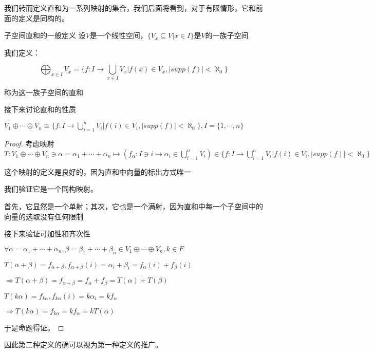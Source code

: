 \documentclass[12pt, a4paper, oneside, UTF8]{ctexbook}
\begin{document}
			我们转而定义直和为一系列映射的集合，我们后面将看到，对于有限情形，它和前面的定义是同构的。
			\begin{defn}{子空间直和的一般定义}
				设$V$是一个线性空间，$\{V_x \subseteq V| x \in I\}$是$V$的一族子空间

				我们定义：

				\begin{equation}
					\bigoplus_{x \in I} V_x = \{f: I \to \bigcup_{x \in I} V_x| f(x) \in V_x,|supp(f)| < \aleph_0\}
				\end{equation}

				称为这一族子空间的直和
			\end{defn}
			接下来讨论直和的性质
			\begin{para}{0}
				\point{}
					\begin{proposition}
						$V_1 \oplus \cdots \oplus V_n \cong \{f: I \to \bigcup\limits_{i=1}^{n} V_i| f(i) \in V_i,|supp(f)| < \aleph_0\},I=\{1,\cdots,n\}$
					\end{proposition}
					\begin{proof}
						考虑映射$T:V_1 \oplus \cdots \oplus V_n \ni \alpha = \alpha_1 + \cdots+\alpha_n \mapsto \left(f_\alpha : I \ni i \mapsto \alpha_i \in \bigcup_{i=1}^{n} V_i\right) \in \{f: I \to \bigcup\limits_{i=1}^{n} V_i| f(i) \in V_i,|supp(f)| < \aleph_0\}$
					
						这个映射的定义是良好的，因为直和中向量的标出方式唯一

						我们验证它是一个同构映射。

						首先，它显然是一个单射；其次，它也是一个满射，因为直和中每一个子空间中的向量的选取没有任何限制

						接下来验证可加性和齐次性

						$\forall \alpha =\alpha_1+\cdots+\alpha_n,\beta =\beta_1+\cdots+\beta_n \in V_1 \oplus \cdots \oplus V_n,k \in F$

						$T(\alpha +\beta )=f_{\alpha +\beta },f_{\alpha +\beta }(i)=\alpha_i + \beta_i = f_\alpha (i)+f_\beta (i)$

						$\Rightarrow T(\alpha+\beta )=f_{\alpha +\beta }=f_\alpha +f_\beta =T(\alpha )+T(\beta )$
					
						$T(k\alpha )=f_{k\alpha },f_{k\alpha }(i)=k\alpha_i=kf_\alpha $

						$\Rightarrow T(k\alpha )=f_{k\alpha }=kf_\alpha =kT(\alpha )$

						于是命题得证。
					\end{proof}
					因此第二种定义的确可以视为第一种定义的推广。
					

\end{para}
\end{document}
